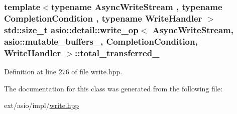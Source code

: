 \subsubsection[{total\+\_\+transferred\+\_\+}]{\setlength{\rightskip}{0pt plus 5cm}template$<$typename Async\+Write\+Stream , typename Completion\+Condition , typename Write\+Handler $>$ std\+::size\+\_\+t {\bf asio\+::detail\+::write\+\_\+op}$<$ Async\+Write\+Stream, {\bf asio\+::mutable\+\_\+buffers\+\_},                           Completion\+Condition, Write\+Handler $>$\+::total\+\_\+transferred\+\_\+}\label{classasio_1_1detail_1_1write__op_3_01_async_write_stream_00_01asio_1_1mutable__buffers__1_00_01_203e79af9e8ed472722d2a863f7168cc_a00fca045b44c95411577cab89e34c41c}


Definition at line 276 of file write.\+hpp.



The documentation for this class was generated from the following file\+:\begin{DoxyCompactItemize}
\item 
ext/asio/impl/\hyperlink{impl_2write_8hpp}{write.\+hpp}\end{DoxyCompactItemize}
